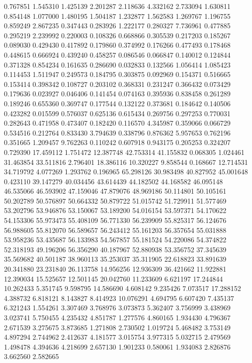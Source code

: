 0.767851
1.545310
1.425139
2.201287
2.118636
4.332162
2.733094
1.630811
0.854148
1.077000
1.480195
1.504187
1.232877
1.562583
1.269767
1.196755
0.859249
2.867235
0.347443
0.283926
1.222177
0.280327
7.736961
0.477885
0.295219
2.239992
0.220003
0.108326
0.668866
0.305539
0.217203
0.185267
0.089030
0.429430
0.417892
0.179860
0.374992
0.176266
0.477493
0.178468
0.448615
0.666924
0.439240
0.458257
0.086546
0.066847
0.140012
0.124844
0.371328
0.854234
0.161635
0.286690
0.032833
0.132566
1.056414
1.085423
0.114453
1.511947
0.249573
0.184795
0.303875
0.092969
0.154371
0.516665
0.153414
0.398342
0.108727
0.203102
0.368331
0.231247
0.366432
0.073429
0.179636
0.023927
0.046406
0.141454
0.074163
0.395936
0.838458
0.261289
0.189246
0.655360
0.369747
0.177544
0.132122
0.373681
0.184642
0.140506
0.423282
0.015599
0.576037
0.625136
0.615434
0.269756
0.297253
0.770031
0.282643
0.471958
0.473407
0.182420
0.116570
4.345987
0.359066
0.066729
0.534516
0.212764
0.833430
3.794639
0.338796
0.876362
5.957653
0.762196
0.351665
1.209457
9.762263
0.110242
0.607918
0.943175
0.205253
0.324207
0.729390
17.459112
1.751472
12.387748
42.753314
41.155832
0.068305
1.024461
31.463854
33.511816
2.796401
18.386116
10.320227
9.858544
0.168667
12.714531
34.719792
4.077269
1.293762
0.196965
65.298126
30.983498
40.827952
45.001648
0.423110
39.147279
40.034456
43.614439
44.182502
44.168582
46.095148
46.535066
46.593902
47.159046
47.879076
48.969186
50.114801
50.105161
50.202789
50.576897
50.664332
50.879722
51.015742
51.729911
51.577469
53.202796
53.946876
53.150067
53.189200
54.016154
53.597371
54.170622
54.153306
55.973473
55.408109
56.771330
56.239909
55.825317
56.124676
56.988605
55.812070
56.589657
56.243412
55.161203
56.357654
55.031888
53.958236
53.435687
56.133983
54.567857
55.181524
54.220086
54.374822
52.318193
49.196206
56.356290
40.187967
52.880938
53.356752
37.345639
35.569682
40.501187
38.960113
35.253037
35.311905
22.618823
33.891639
20.341880
23.231840
26.113758
14.956256
12.936309
36.421662
11.922881
12.390034
15.525657
12.501145
20.042760
11.233609
6.621197
17.244844
10.262433
5.351745
9.598795
14.586690
4.608142
9.235426
7.073517
17.288152
4.388732
6.818121
8.143827
8.414923
10.076291
4.694795
6.607420
7.435137
6.321243
1.554261
3.307469
3.768976
3.073873
5.362407
3.756999
3.438969
3.023741
5.750455
4.235432
4.851787
1.277576
4.860165
1.934430
4.796367
2.671539
3.275675
3.873685
1.271808
2.730502
1.019724
5.468482
3.753149
4.897294
2.744962
2.412637
4.181577
3.015754
3.977315
5.032715
2.479569
1.498478
4.394636
4.218699
2.657130
1.901233
0.580061
1.934083
2.826876
3.662560
2.582665
